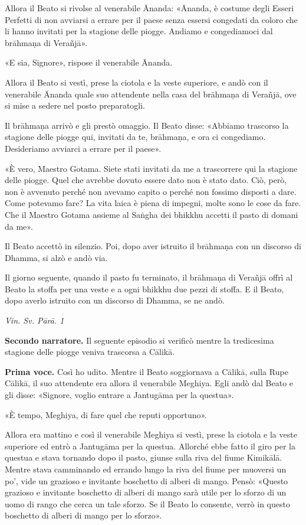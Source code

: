 Allora il Beato si rivolse al venerabile Ānanda: «Ānanda, è costume
degli Esseri Perfetti di non avviarsi a errare per il paese senza
essersi congedati da coloro che li hanno invitati per la stagione delle
piogge. Andiamo e congediamoci dal brāhmaṇa di Verañjā».


«E sia, Signore», rispose il venerabile Ānanda.


Allora il Beato si vestì, prese la ciotola e la veste superiore, e andò
con il venerabile Ānanda quale suo attendente nella casa del brāhmaṇa di
Verañjā, ove si mise a sedere nel posto preparatogli.


Il brāhmaṇa arrivò e gli prestò omaggio. Il Beato disse: «Abbiamo
trascorso la stagione delle piogge qui, invitati da te, brāhmaṇa, e ora
ci congediamo. Desideriamo avviarci a errare per il paese».


«È vero, Maestro Gotama. Siete stati invitati da me a trascorrere qui la
stagione delle piogge. Quel che avrebbe dovuto essere dato non è stato
dato. Ciò, però, non è avvenuto perché non avevamo capito o perché non
fossimo disposti a dare. Come potevamo fare? La vita laica è piena di
impegni, molte sono le cose da fare. Che il Maestro Gotama assieme al
Saṅgha dei bhikkhu accetti il pasto di domani da me».


Il Beato accettò in silenzio. Poi, dopo aver istruito il brāhmaṇa con un
discorso di Dhamma, si alzò e andò via.


Il giorno seguente, quando il pasto fu terminato, il brāhmaṇa di Verañjā
offrì al Beato la stoffa per una veste e a ogni bhikkhu due pezzi di
stoffa. E il Beato, dopo averlo istruito con un discorso di Dhamma, se
ne andò.


\emph{Vin. Sv. Pārā. 1}


\textbf{Secondo narratore.} Il seguente episodio si verificò mentre la
tredicesima stagione delle piogge veniva trascorsa a Cālikā.


\textbf{Prima voce.} Così ho udito. Mentre il Beato soggiornava a Cālikā, sulla
Rupe Cālikā, il suo attendente era allora il venerabile Meghiya. Egli
andò dal Beato e gli disse: «Signore, voglio entrare a Jantugāma per la
questua».


«È tempo, Meghiya, di fare quel che reputi opportuno».


Allora era mattino e così il venerabile Meghiya si vestì, prese la
ciotola e la veste superiore ed entrò a Jantugāma per la questua.
Allorché ebbe fatto il giro per la questua e stava tornando dopo il
pasto, giunse sulla riva del fiume Kimikālā. Mentre stava camminando ed
errando lungo la riva del fiume per muoversi un po’, vide un grazioso e
invitante boschetto di alberi di mango. Pensò: «Questo grazioso e
invitante boschetto di alberi di mango sarà utile per lo sforzo di un
uomo di rango che cerca un tale sforzo. Se il Beato lo consente, verrò
in questo boschetto di alberi di mango per lo sforzo».


